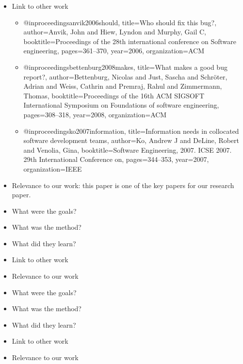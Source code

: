 \documentclass{mprop}
\begin{document}
\begin{itemize}
\item Link to other work
  \begin{itemize}
    \item @inproceedings{anvik2006should,
  title={Who should fix this bug?},
  author={Anvik, John and Hiew, Lyndon and Murphy, Gail C},
  booktitle={Proceedings of the 28th international conference on Software engineering},
  pages={361--370},
  year={2006},
  organization={ACM}
    }
      \item @inproceedings{bettenburg2008makes,
  title={What makes a good bug report?},
  author={Bettenburg, Nicolas and Just, Sascha and Schr{\"o}ter, Adrian and Weiss, Cathrin and Premraj, Rahul and Zimmermann, Thomas},
  booktitle={Proceedings of the 16th ACM SIGSOFT International Symposium on Foundations of software engineering},
  pages={308--318},
  year={2008},
  organization={ACM}
      }
        \item @inproceedings{ko2007information,
  title={Information needs in collocated software development teams},
  author={Ko, Andrew J and DeLine, Robert and Venolia, Gina},
  booktitle={Software Engineering, 2007. ICSE 2007. 29th International Conference on},
  pages={344--353},
  year={2007},
  organization={IEEE}
        }
  \end{itemize}
\item Relevance to our work: this paper is one of the key papers for our
  research paper.
\end{itemize}

\citep{Korkala2014WasteIdentification}
\begin{itemize}
\item What were the goals?
  
\item What was the method?
\item What did they learn?
\item Link to other work
\item Relevance to our work
\end{itemize}

\citep{aranda2009secret}
\begin{itemize}
\item What were the goals?
\item What was the method?
\item What did they learn?
\item Link to other work
\item Relevance to our work
\end{itemize}
\end{document}
